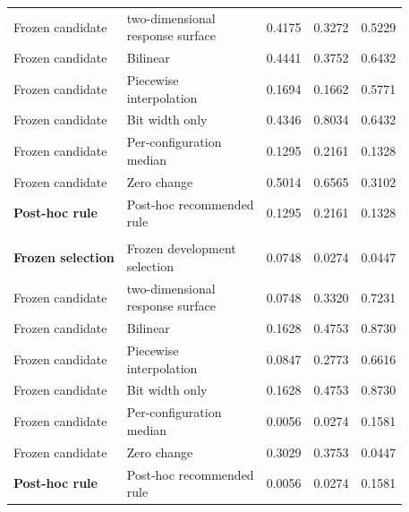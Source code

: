 \begin{table}[!htbp]
\begin{tabular*}{\textwidth}{@{\extracolsep{\fill}}llrrr@{}}
Frozen candidate & \shortstack[l]{two-dimensional\\response surface} & 0.4175 & 0.3272 & 0.5229 \\
Frozen candidate & Bilinear & 0.4441 & 0.3752 & 0.6432 \\
Frozen candidate & \shortstack[l]{Piecewise\\interpolation} & 0.1694 & 0.1662 & 0.5771 \\
Frozen candidate & Bit width only & 0.4346 & 0.8034 & 0.6432 \\
Frozen candidate & \shortstack[l]{Per-configuration\\median} & 0.1295 & 0.2161 & 0.1328 \\
Frozen candidate & Zero change & 0.5014 & 0.6565 & 0.3102 \\
\textbf{\mbox{Post-hoc} rule} & \shortstack[l]{\mbox{Post-hoc} recommended\\rule} & 0.1295 & 0.2161 & 0.1328 \\
\addlinespace
\multicolumn{5}{@{}l}{\textit{New state, $g=128$; $n=3$}} \\
\textbf{Frozen selection} & \shortstack[l]{Frozen development\\selection} & 0.0748 & 0.0274 & 0.0447 \\
Frozen candidate & \shortstack[l]{two-dimensional\\response surface} & 0.0748 & 0.3320 & 0.7231 \\
Frozen candidate & Bilinear & 0.1628 & 0.4753 & 0.8730 \\
Frozen candidate & \shortstack[l]{Piecewise\\interpolation} & 0.0847 & 0.2773 & 0.6616 \\
Frozen candidate & Bit width only & 0.1628 & 0.4753 & 0.8730 \\
Frozen candidate & \shortstack[l]{Per-configuration\\median} & 0.0056 & 0.0274 & 0.1581 \\
Frozen candidate & Zero change & 0.3029 & 0.3753 & 0.0447 \\
\textbf{\mbox{Post-hoc} rule} & \shortstack[l]{\mbox{Post-hoc} recommended\\rule} & 0.0056 & 0.0274 & 0.1581 \\
\bottomrule
\end{tabular*}
\end{table}
